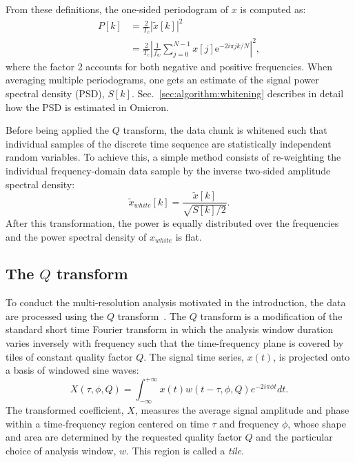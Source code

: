 From these definitions, the one-sided periodogram of $x$ is computed as:
\begin{align}
  P[k] &= \frac{2}{T_c}\left|\tilde{x}[k]\right|^2 \\
  &= \frac{2}{T_c}\left| \frac{1}{f_w}\sum_{j=0}^{N-1}{x[j]\mathrm{e}^{-2i\pi jk/N}} \right|^2,
  \label{eq:periodogram}
\end{align}
where the factor 2 accounts for both negative and positive frequencies. When averaging multiple periodograms, one gets an estimate of the signal power spectral density (PSD), $S[k]$. Sec.~\ref{sec:algorithm:whitening} describes in detail how the PSD is estimated in Omicron. 

Before being applied the $Q$ transform, the data chunk is whitened such that individual samples of the discrete time sequence are statistically independent random variables. To achieve this, a simple method consists of re-weighting the individual frequency-domain data sample by the inverse two-sided amplitude spectral density:
\begin{equation}
  \tilde{x}_{white}[k] = \frac{\tilde{x}[k]}{\sqrt{S[k]/2}}.
  \label{eq:white}
\end{equation}
After this transformation, the power is equally distributed over the frequencies and the power spectral density of $x_{white}$ is flat.


\subsection{The $Q$ transform} \label{sec:analysis:qtransform}
To conduct the multi-resolution analysis motivated in the introduction, the data are processed using the $Q$ transform~\cite{Brown:1991}. The $Q$ transform is a modification of the standard short time Fourier transform in which the analysis window duration varies inversely with frequency such that the time-frequency plane is covered by tiles of constant quality factor $Q$. The signal time series, $x(t)$, is projected onto a basis of windowed sine waves:
\begin{equation}
  X(\tau, \phi, Q) = \int_{-\infty}^{+\infty}{ x(t) w(t-\tau,\phi,Q) e^{-2i\pi\phi t}dt}.
  \label{eq:qtransform1}
\end{equation}
The transformed coefficient, $X$, measures the average signal amplitude and phase within a time-frequency region centered on time $\tau$ and frequency $\phi$, whose shape and area are determined by the requested quality factor $Q$ and the particular choice of analysis window, $w$. This region is called a \textit{tile}.

